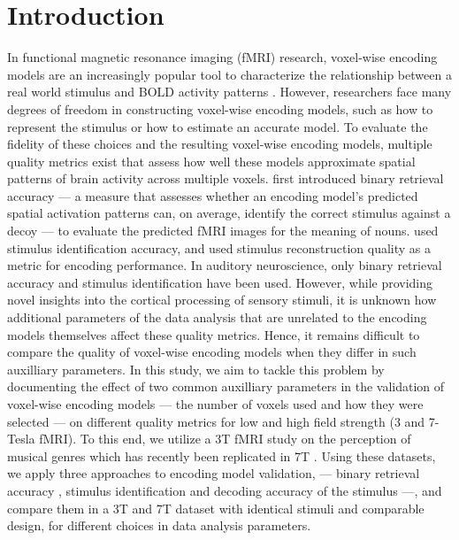 \section*{Introduction}

In functional magnetic resonance imaging (f{MRI}) research, voxel-wise encoding models are an increasingly popular tool to characterize the relationship between a real world stimulus and BOLD activity patterns \citep{TD+06,KG+08,NG11,huth2012continuous,holdgraf2016rapid}. However, researchers face many degrees of freedom in constructing voxel-wise encoding models, such as how to represent the stimulus or how to estimate an accurate model. To evaluate the fidelity of these choices and the resulting voxel-wise encoding models, multiple quality metrics exist that assess how well these models approximate spatial patterns of brain activity across multiple voxels. \citet{ML08} first introduced binary retrieval accuracy --- a measure that assesses whether an encoding model's predicted spatial activation patterns can, on average, identify the correct stimulus against a decoy --- to evaluate the predicted f{MRI} images for the meaning of nouns. \citet{KG+08} used stimulus identification accuracy, and \citet{NG09} used stimulus reconstruction quality as a metric for encoding performance. In auditory neuroscience, only binary retrieval accuracy \citep{CTK+2012,hoefle2018identifying} and stimulus identification \citep{SF14,allen2018encoding} have been used.
However, while providing novel insights into the cortical processing of sensory stimuli, it is unknown how additional parameters of the data analysis that are unrelated to the encoding models themselves affect these quality metrics. Hence, it remains difficult to compare the quality of voxel-wise encoding models when they differ in such auxilliary parameters.
In this study, we aim to tackle this problem by documenting the effect of two common auxilliary parameters in the validation of voxel-wise encoding models --- the number of voxels used and how they were selected --- on different quality metrics for low and high field strength (3 and 7-Tesla f{MRI}). To this end, we utilize a 3T f{MRI} study on the perception of musical genres \citep{CTK+2012} which has recently been replicated in 7T \citep{HDH+2015}. Using these datasets, we apply three approaches to encoding model validation, --- binary retrieval accuracy \citep{ML08}, stimulus identification \citep{KG+08,SF14} and decoding accuracy of the stimulus \citep{NG09} ---, and compare them in a 3T and 7T dataset with identical stimuli and comparable design, for different choices in data analysis parameters.

